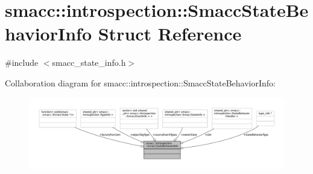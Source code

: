 \hypertarget{structsmacc_1_1introspection_1_1SmaccStateBehaviorInfo}{}\section{smacc\+:\+:introspection\+:\+:Smacc\+State\+Behavior\+Info Struct Reference}
\label{structsmacc_1_1introspection_1_1SmaccStateBehaviorInfo}


{\ttfamily \#include $<$smacc\+\_\+state\+\_\+info.\+h$>$}



Collaboration diagram for smacc\+:\+:introspection\+:\+:Smacc\+State\+Behavior\+Info\+:
\nopagebreak
\begin{figure}[H]
\begin{center}
\leavevmode
\includegraphics[width=350pt]{structsmacc_1_1introspection_1_1SmaccStateBehaviorInfo__coll__graph}
\end{center}
\end{figure}
